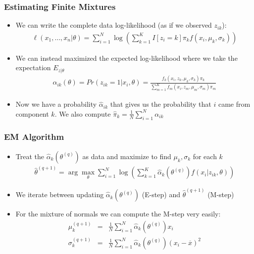 \begin{frame}
\frametitle{Estimating Finite Mixtures}
\begin{itemize}
\item We can write the complete data log-likelihood (as if we observed $z_{ik}$):
\begin{eqnarray*}
\ell(x_1,\ldots,x_n | \theta) = \sum_{i=1}^N  \log \left( \sum_{k=1}^K I[z_i = k]  \pi_k f(x_i , \mu_k, \sigma_k) \right)
\end{eqnarray*}
\item We can instead maximized the expected log-likelihood where we take the expectation $E_{z|\theta}$
\begin{eqnarray*}
\alpha_{ik}(\theta) = Pr(z_{ik} =1 | x_i,\theta) = \frac{f_k(x_i,z_k,\mu_k,\sigma_k) \pi_k }{\sum_{m=1}^K f_m(x_i,z_m,\mu_m,\sigma_m) \pi_m}
\end{eqnarray*}
\item Now we have a probability $\hat{\alpha}_{ik}$ that gives us the probability that $i$ came from component $k$. We also compute $\hat{\pi}_k = \frac{1}{N} \sum_{i=1}^N \alpha_{ik}$
\end{itemize}
\end{frame}

\begin{frame}
\frametitle{EM Algorithm}
\begin{itemize}
\item Treat the $\hat{\alpha}_k(\theta^{(q)})$ as data and maximize to find $\mu_k,\sigma_k$ for each $k$
\begin{eqnarray*}
\hat{\theta}^{(q+1)} = \arg \max_{\theta}  \sum_{i=1}^N  \log \left( \sum_{k=1}^K \hat{\alpha}_k(\theta^{(q)}) f(x_i | z_{ik}, \theta ) \right)
\end{eqnarray*}
\item We iterate between updating $\hat{\alpha}_k(\theta^{(q)})$ (E-step) and $\hat{\theta}^{(q+1)}$ (M-step)
\item For the mixture of normals we can compute the M-step very easily:
\begin{eqnarray*}
\mu_k^{(q+1)} &=& \frac{1}{N} \sum_{i=1}^N \hat{\alpha}_k(\theta^{(q)}) x_{i}\\
\sigma_k^{(q+1)} &=& \frac{1}{N} \sum_{i=1}^N \hat{\alpha}_k(\theta^{(q)}) (x_{i} - \overline{x})^2 \\
\end{eqnarray*}
\end{itemize}
\end{frame}

